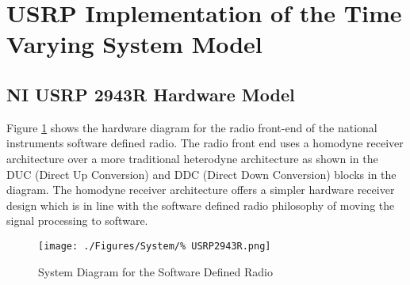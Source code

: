 \section{USRP Implementation of the Time Varying System Model}

\subsection{NI USRP 2943R Hardware Model}
Figure \ref{fig:USRPDiagram} shows the hardware diagram %
for the radio front-end of the national instruments %
software defined radio. The radio front end uses a homodyne %
receiver architecture over a more traditional heterodyne %
architecture as shown in the DUC (Direct Up Conversion) and %
DDC (Direct Down Conversion) blocks in the diagram. The homodyne %
receiver architecture offers a simpler hardware receiver design %
which is in line with the software defined radio philosophy of %
moving the signal processing to software.
\begin{figure}[ht]
	\texttt{[image: ./Figures/System/\%
	USRP2943R.png]}
	\caption{System Diagram for the Software Defined Radio%
	\cite{USRPDiagram}}
	\label{fig:USRPDiagram}
\end{figure}


